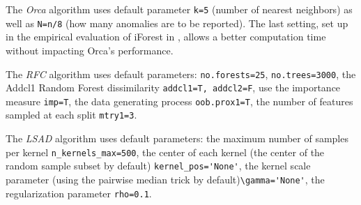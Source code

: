 The \emph{Orca} algorithm uses default parameter \verb+k=5+ (number of nearest neighbors)
as well as \verb+N=n/8+ (how many anomalies are to be reported).
The last setting, set up in the empirical evaluation of iForest in \cite{Liu2012},
allows a better computation time without impacting Orca's performance.


The \emph{RFC} algorithm uses default parameters:
\verb+no.forests=25+, \verb+no.trees=3000+,
the Addcl1 Random Forest dissimilarity \verb+addcl1=T, addcl2=F+,
use the importance measure \verb+imp=T+,
the data generating process \verb+oob.prox1=T+,
the number of features sampled at each split \verb+mtry1=3+.

The \emph{LSAD} algorithm uses default parameters:
the maximum number of samples per kernel \verb+n_kernels_max=500+,
the center of each kernel (the center of the random sample subset by default) \verb+kernel_pos='None'+,
the kernel scale parameter (using the pairwise median trick by default)\verb+\gamma='None'+,
the regularization parameter \verb+rho=0.1+.

